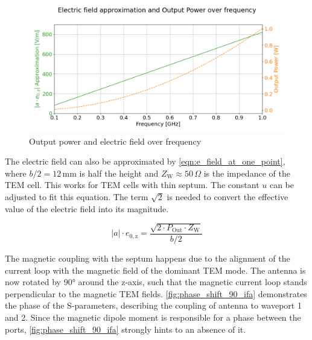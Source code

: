 \begin{figure}[h]
    \centering
    \includegraphics[width=1\linewidth]{Documentation//content//30_simulations//img/output_power_e_fields_over_freq_ifa.png}
    \caption{Output power and electric field over frequency}
    \label{fig:output_power_e_fields_over_freq_ifa}
\end{figure}

The electric field can also be approximated by \autoref{eqn:e_field_at_one_point}, where $b/2=12\,\mathrm{mm}$ is half the height and $Z_\mathrm{W}\approx50\,\Omega$ is the impedance of the TEM cell. This works for TEM cells with thin septum. The constant $u$ can be adjusted to fit this equation. The term $\sqrt{2}$ is needed to convert the effective value of the electric field into its magnitude.

\begin{equation}
    |a|\cdot e_{\mathrm{0,z}}=\frac{\sqrt{2\cdot P_\mathrm{Out}\cdot Z_\mathrm{W}}}{b/2}
    \label{eqn:e_field_at_one_point}
\end{equation}


The magnetic coupling with the septum happens due to the alignment of the current loop with the magnetic field of the dominant TEM mode. The antenna is now rotated by 90° around the z-axis, such that the magnetic current loop stands perpendicular to the magnetic TEM fields. \autoref{fig:phase_shift_90_ifa} demonstrates the phase of the S-parameters, describing the coupling of antenna to waveport 1 and 2. Since the magnetic dipole moment is responsible for a phase between the ports, \autoref{fig:phase_shift_90_ifa} strongly hints to an absence of it.

